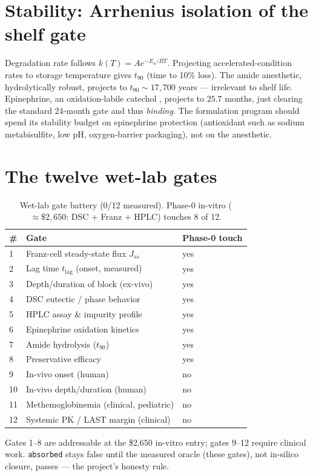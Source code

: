\documentclass[11pt,a4paper]{article}
\begin{document}
\section{Stability: Arrhenius isolation of the shelf gate}
\label{sec:arrhenius}
Degradation rate follows $k(T)=A e^{-E_a/RT}$. Projecting accelerated-condition
rates to storage temperature gives $t_{90}$ (time to 10\% loss). The amide
anesthetic, hydrolytically robust, projects to $t_{90}\sim17{,}700$ years ---
irrelevant to shelf life. Epinephrine, an oxidation-labile catechol
\citep{connors2008}, projects to $25.7$ months, just clearing the standard
24-month gate and thus \emph{binding}. The formulation program should spend its
stability budget on epinephrine protection (antioxidant such as sodium
metabisulfite, low pH, oxygen-barrier packaging), not on the anesthetic.

\section{The twelve wet-lab gates}
\label{sec:gates12}
\begin{table}[h]
\centering
\caption{Wet-lab gate battery (0/12 measured). Phase-0 in-vitro
($\approx\$2{,}650$: DSC + Franz + HPLC) touches 8 of 12.}
\label{tab:wet}
\small
\begin{tabular}{@{}lll@{}}
\toprule
\# & Gate & Phase-0 touch \\
\midrule
1 & Franz-cell steady-state flux $J_{ss}$ & yes \\
2 & Lag time $t_{\mathrm{lag}}$ (onset, measured) & yes \\
3 & Depth/duration of block (ex-vivo) & yes \\
4 & DSC eutectic / phase behavior & yes \\
5 & HPLC assay \& impurity profile & yes \\
6 & Epinephrine oxidation kinetics & yes \\
7 & Amide hydrolysis ($t_{90}$) & yes \\
8 & Preservative efficacy & yes \\
9 & In-vivo onset (human) & no \\
10 & In-vivo depth/duration (human) & no \\
11 & Methemoglobinemia (clinical, pediatric) & no \\
12 & Systemic PK / LAST margin (clinical) & no \\
\bottomrule
\end{tabular}
\end{table}
Gates 1--8 are addressable at the \$2{,}650 in-vitro entry; gates 9--12 require
clinical work. \texttt{absorbed} stays false until the measured oracle (these
gates), not in-silico closure, passes --- the project's honesty rule.
\end{document}
